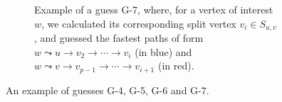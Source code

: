 \documentclass{article}
\begin{document}
\begin{figure}
\begin{subfigure}{0.48\textwidth}
{}
	\caption{Example of a guess G-7, where, for a vertex of interest $w$, 
		we
		calculated its corresponding split vertex $v_i \in S_{u,v}$,
		and guessed the fastest paths of form
		$w \leadsto u \rightarrow v_2 \rightarrow \cdots \rightarrow v_i$  (in blue) 
		and $w \leadsto v \rightarrow v_{p-1} \rightarrow \cdots \rightarrow v_{i+1}$ (in red). 
		\label{fig:FPT-guessG7}}
	\end{subfigure}
\caption{An example of guesses G-4, G-5, G-6 and G-7.}
\end{figure}
\end{document}
